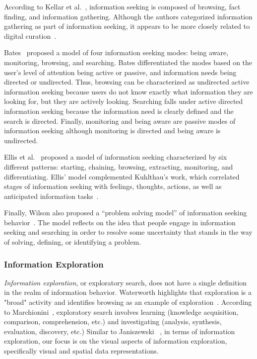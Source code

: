 \documentclass{sigchi}
\begin{document}
According to Kellar et al.~\cite{kellar2006goal}, information seeking is composed of browsing, fact finding, and information gathering. Although the authors categorized information gathering as part of information seeking, it appears to be more closely related to digital curation~\cite{beagrie2008digital,whittaker2011personal}. 

Bates~\cite{bates1986exploratory,bates2002toward} proposed a model of four information seeking modes: being aware, monitoring, browsing, and searching. Bates differentiated the modes based on the user's level of attention being active or passive, and information needs being directed or undirected. Thus, browsing can be characterized as undirected active information seeking because users do not know exactly what information they are looking for, but they are actively looking. Searching falls under active directed information seeking because the information need is clearly defined and the search is directed. Finally, monitoring and being aware are passive modes of information seeking although monitoring is directed and being aware is undirected.

Ellis et al.~\cite{ellis1989behavioural,ellis1993comparison,ellis1997modelling} proposed a model of information seeking characterized by six different patterns: starting, chaining, browsing, extracting, monitoring, and differentiating. Ellis' model complemented Kuhlthau's work, which correlated stages of information seeking with feelings, thoughts, actions, as well as anticipated information tasks~\cite{kuhlthau1991inside}.

Finally, Wilson also proposed a ``problem solving model'' of information seeking behavior~\cite{wilson1999models}. The model reflects on the idea that people engage in information seeking and searching in order to resolve some uncertainty that stands in the way of solving, defining, or identifying a problem.  

\subsubsection{Information Exploration}
\textit{Information exploration}, or exploratory search, does not have a single definition in the realm of information behavior. Waterworth highlights that exploration is a "broad" activity and identifies browsing as an example of exploration~\cite{waterworth1991model}. According to Marchionini~\cite{marchionini2006exploratory}, exploratory search involves learning (knowledge acquisition, comparison, comprehension, etc.) and investigating (analysis, synthesis, evaluation, discovery, etc.) Similar to Janiszewski ~\cite{janiszewski1998influence}, in terms of information exploration, our focus is on the visual aspects of information exploration, specifically visual and spatial data representations.
\end{document}
